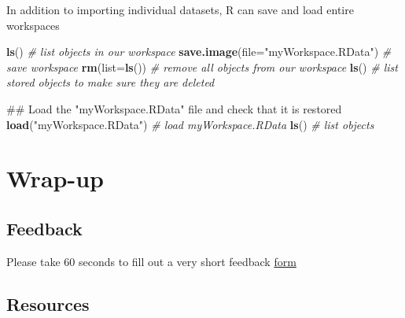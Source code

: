 \documentclass[]{book}
\newenvironment{Shaded}{\begin{snugshade}}{\end{snugshade}}
\newcommand{\KeywordTok}[1]{\textcolor[rgb]{0.13,0.29,0.53}{\textbf{#1}}}
\newcommand{\DataTypeTok}[1]{\textcolor[rgb]{0.13,0.29,0.53}{#1}}
\newcommand{\StringTok}[1]{\textcolor[rgb]{0.31,0.60,0.02}{#1}}
\newcommand{\CommentTok}[1]{\textcolor[rgb]{0.56,0.35,0.01}{\textit{#1}}}
\newcommand{\NormalTok}[1]{#1}
\begin{document}
In addition to importing individual datasets, R can save and load entire
workspaces

\begin{Shaded}
\begin{Highlighting}[]
\KeywordTok{ls}\NormalTok{() }\CommentTok{# list objects in our workspace}
\KeywordTok{save.image}\NormalTok{(}\DataTypeTok{file=}\StringTok{"myWorkspace.RData"}\NormalTok{) }\CommentTok{# save workspace }
\KeywordTok{rm}\NormalTok{(}\DataTypeTok{list=}\KeywordTok{ls}\NormalTok{()) }\CommentTok{# remove all objects from our workspace }
\KeywordTok{ls}\NormalTok{() }\CommentTok{# list stored objects to make sure they are deleted}
\end{Highlighting}
\end{Shaded}

\begin{Shaded}
\begin{Highlighting}[]
\NormalTok{## Load the "myWorkspace.RData" file and check that it is restored}
\KeywordTok{load}\NormalTok{(}\StringTok{"myWorkspace.RData"}\NormalTok{) }\CommentTok{# load myWorkspace.RData}
\KeywordTok{ls}\NormalTok{() }\CommentTok{# list objects}
\end{Highlighting}
\end{Shaded}

\section{Wrap-up}\label{wrap-up}

\subsection{Feedback}\label{feedback}

Please take 60 seconds to fill out a very short feedback
\href{http://bit.ly/training_class_eval}{form}

\subsection{Resources}\label{resources}
\end{document}
